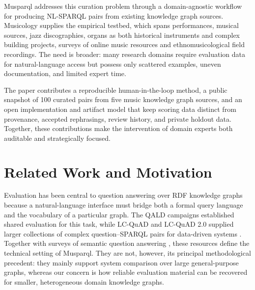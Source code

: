 Musparql addresses this curation problem through a domain-agnostic workflow for producing NL-SPARQL pairs from existing knowledge graph sources. Musicology supplies the empirical testbed, which spans performances, musical sources, jazz discographies, organs as both historical instruments and complex building projects, surveys of online music resources and ethnomusicological field recordings. The need is broader: many research domains require evaluation data for natural-language access but possess only scattered examples, uneven documentation, and limited expert time.

The paper contributes a reproducible human-in-the-loop method, a public snapshot of 100 curated pairs from five music knowledge graph sources, and an open implementation and artifact model that keep scoring data distinct from provenance, accepted rephrasings, review history, and private holdout data. Together, these contributions make the intervention of domain experts both auditable and strategically focused.

\section{Related Work and Motivation}\label{related-work-and-motivation}

Evaluation has been central to question answering over RDF knowledge graphs because a natural-language interface must bridge both a formal query language and the vocabulary of a particular graph. The QALD campaigns established shared evaluation for this task, while LC-QuAD and LC-QuAD 2.0 supplied larger collections of complex question--SPARQL pairs for data-driven systems \citep{lopez2013evaluating, trivedi2017lcquad, dubey2019lcquad2}. Together with surveys of semantic question answering \citep{hoffner2017survey, diefenbach2018core}, these resources define the technical setting of Musparql. They are not, however, its principal methodological precedent: they mainly support system comparison over large general-purpose graphs, whereas our concern is how reliable evaluation material can be recovered for smaller, heterogeneous domain knowledge graphs.

